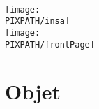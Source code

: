 
\maketitle

\thispagestyle{empty}

\hfill\\
\vfill


\begin{center}
    \texttt{[image: \\PIXPATH/insa]}\hfill\\
    \texttt{[image: \\PIXPATH/frontPage]}
\end{center}

\section*{Objet}
\Object

\pagebreak
